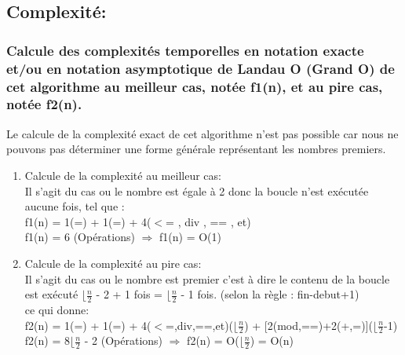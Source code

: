 \documentclass[12pt]{article}
\begin{document}
\subsection{Complexité:}

\subsubsection{Calcule des complexités temporelles en notation exacte et/ou en notation asymptotique de Landau O (Grand O) de  cet  algorithme au meilleur cas, notée f1(n), et au pire cas, notée f2(n). }
Le calcule de la complexité exact de cet algorithme n'est pas possible car nous ne pouvons pas déterminer une forme générale représentant les nombres premiers.
 
\begin{enumerate}
	\item Calcule de la complexité au meilleur cas:
	\\
	Il s'agit du cas ou le nombre est égale à 2 donc la boucle n'est exécutée aucune fois, tel que :
	\\
	f1(n) = 1(=) + 1(=) + 4($<$= , div , == , et) 
	\\
	\color{blue}
	f1(n) = 6 (Opérations) $\Rightarrow$ f1(n) = O(1)
	\color{black}
	\\
	\item Calcule de la complexité au pire cas:
	\\
	Il s'agit du cas ou le nombre est premier c'est à dire le contenu de la boucle est exécuté $\lfloor{\frac{n}{2}}$ - 2 + 1 fois = $\lfloor{\frac{n}{2}}$ - 1 fois.
	(selon la règle : fin-debut+1)
	\\
	ce qui donne:
	\\
	f2(n) = 1(=) + 1(=) + 4($<$=,div,==,et)($\lfloor{\frac{n}{2}}$) + [2(mod,==)+2(+,=)]($\lfloor{\frac{n}{2}}$-1) 
	\\
	\color{blue}
	f2(n) = 8$\lfloor{\frac{n}{2}}$ - 2 (Opérations) $\Rightarrow$ f2(n) = O($\lfloor{\frac{n}{2}}$) = O(n)
	\color{black}
\end{enumerate}
\end{document}
